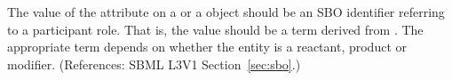 The value of the  attribute on a \SpeciesReference or a
\ModifierSpeciesReference object should be an SBO identifier referring to a
participant role.  That is, the value should be a term derived from
\sboparticipantrole.  The appropriate term depends on whether the entity is
a reactant, product or modifier.  (References: SBML L3V1
Section~\ref{sec:sbo}.)
